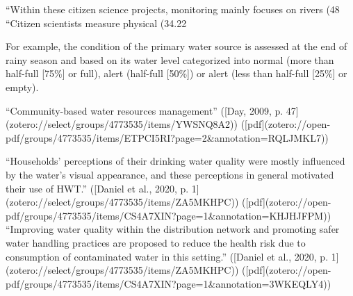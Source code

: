 “Within these citizen science projects, monitoring mainly focuses on rivers (48%
“Citizen scientists measure physical (34.22%

For example, the condition of the primary water source is assessed at the end of rainy season and based on its water level categorized into normal (more than half-full [75\%] or full), alert (half-full [50\%]) or alert (less than half-full [25\%] or empty).


“Community-based water resources management” ([Day, 2009, p. 47](zotero://select/groups/4773535/items/YWSNQ8A2)) ([pdf](zotero://open-pdf/groups/4773535/items/ETPCI5RI?page=2&annotation=RQLJMKL7))

“Households’ perceptions of their drinking water quality were mostly influenced by the water’s visual appearance, and these perceptions in general motivated their use of HWT.” ([Daniel et al., 2020, p. 1](zotero://select/groups/4773535/items/ZA5MKHPC)) ([pdf](zotero://open-pdf/groups/4773535/items/CS4A7XIN?page=1&annotation=KHJHJFPM))
“Improving water quality within the distribution network and promoting safer water handling practices are proposed to reduce the health risk due to consumption of contaminated water in this setting.” ([Daniel et al., 2020, p. 1](zotero://select/groups/4773535/items/ZA5MKHPC)) ([pdf](zotero://open-pdf/groups/4773535/items/CS4A7XIN?page=1&annotation=3WKEQLY4))

